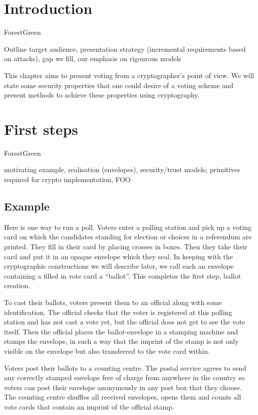 \documentclass{llncs}
\newenvironment{structure}{
  \begin{color}{ForestGreen}
}{
  \end{color}
}
\begin{document}
\section{Introduction}

\begin{structure}
Outline target audience, presentation strategy (incremental requirements based on attacks), gap we fill, our emphasis on rigourous models
\end{structure}

This chapter aims to present voting from a cryptographer's point of view. We
will state some security properties that one could desire of a voting scheme and
present methods to achieve these properties using cryptography. 

\section{First steps}

\begin{structure}
motivating example, realisation (envelopes), security/trust models;
primitives required for crypto implementation, FOO
\end{structure}

\subsection{Example}

Here is one way to run a poll. Voters enter a polling station and pick up a voting card on which the candidates standing for election or choices in a referendum are printed. They fill in their card by placing crosses in boxes. Then they take their card and put it in an opaque envelope which they seal. In keeping with the cryptographic constructions we will describe later, we call such an envelope containing a filled in vote card a ``ballot''. This completes the first step, ballot creation.

To cast their ballots, voters present them to an official along with some identification. The official checks that the voter is registered at this polling station and has not cast a vote yet, but the official does not get to see the vote itself. Then the official places the ballot-envelope in a stamping machine and stamps the envelope, in such a way that the imprint of the stamp is not only visible on the envelope but also transferred to the vote card within.

Voters post their ballots to a counting centre. The postal service agrees to
send any correctly stamped envelope free of charge from anywhere in the country
so voters can post their envelope anonymously in any post box that they choose.
The counting centre shuffles all received envelopes, opens them and counts all
vote cards that contain an imprint of the official stamp.
\end{document}
